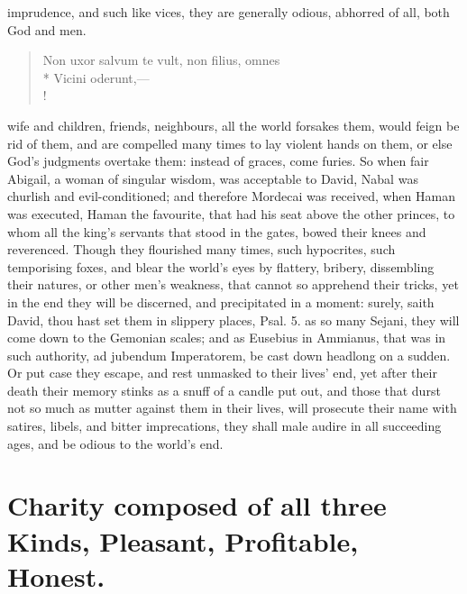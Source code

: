 {imprudence, and such like vices, they are generally odious, abhorred of
all, both God and men.
%
\begin{latin}
\begin{verse}
Non uxor salvum te vult, non filius, omnes\\*
Vicini oderunt,---\\!
\end{verse}
\end{latin}
%
wife and children, friends, neighbours, all the world forsakes them,
would feign be rid of them, and are compelled many times to lay violent
hands on them, or else God's judgments overtake them: instead of
graces, come furies. So when fair Abigail, a woman of singular
wisdom, was acceptable to David, Nabal was churlish and
evil-conditioned; and therefore Mordecai was received, when Haman
was executed, Haman the favourite, that had his seat above the other
princes, to whom all the king's servants that stood in the gates, bowed
their knees and reverenced. Though they flourished many times, such
hypocrites, such temporising foxes, and blear the world's eyes by
flattery, bribery, dissembling their natures, or other men's weakness,
that cannot so apprehend their tricks, yet in the end they will be
discerned, and precipitated in a moment: surely, saith David, thou hast
set them in slippery places, Psal.  5. as so many Sejani, they
will come down to the Gemonian scales; and as Eusebius in 
Ammianus, that was in such authority, ad jubendum Imperatorem, be cast
down headlong on a sudden. Or put case they escape, and rest unmasked
to their lives' end, yet after their death their memory stinks as a
snuff of a candle put out, and those that durst not so much as mutter
against them in their lives, will prosecute their name with satires,
libels, and bitter imprecations, they shall male audire in all
succeeding ages, and be odious to the world's end.


\section[Charity]{Charity composed of all three Kinds, Pleasant, Profitable, Honest.}

}
